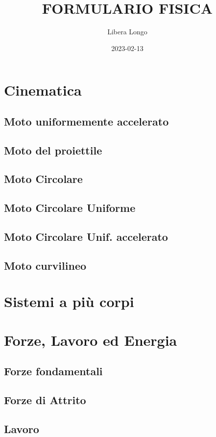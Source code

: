 \documentclass[70pt]{article}
\title{FORMULARIO FISICA}
\date{2023-02-13}
\author{Libera Longo}
\begin{document}
	\begin{small}
	\begin{multicols}{3}

\section{Cinematica}
	\subsection{Moto uniformemente accelerato}
	\subsection{Moto del proiettile}
	\subsection{Moto Circolare}
	\subsection{Moto Circolare Uniforme}
	\subsection{Moto Circolare Unif. accelerato}
	\subsection{Moto curvilineo}
\section{Sistemi a più corpi}
\section{Forze, Lavoro ed Energia}
	\subsection{Forze fondamentali}
	\subsection{Forze di Attrito}
	\subsection{Lavoro}

\end{multicols}
\end{small}
\end{document}
